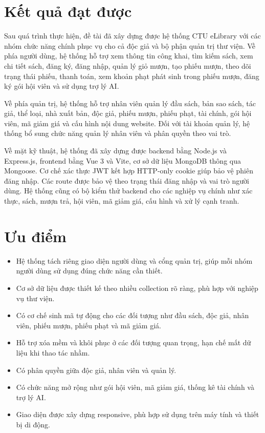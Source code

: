 \documentclass[../main.tex]{subfiles}
\begin{document}
\section{Kết quả đạt được}

Sau quá trình thực hiện, đề tài đã xây dựng được hệ thống CTU eLibrary với các nhóm chức năng chính phục vụ cho cả độc giả và bộ phận quản trị thư viện. Về phía người dùng, hệ thống hỗ trợ xem thông tin công khai, tìm kiếm sách, xem chi tiết sách, đăng ký, đăng nhập, quản lý giỏ mượn, tạo phiếu mượn, theo dõi trạng thái phiếu, thanh toán, xem khoản phạt phát sinh trong phiếu mượn, đăng ký gói hội viên và sử dụng trợ lý AI.

Về phía quản trị, hệ thống hỗ trợ nhân viên quản lý đầu sách, bản sao sách, tác giả, thể loại, nhà xuất bản, độc giả, phiếu mượn, phiếu phạt, tài chính, gói hội viên, mã giảm giá và cấu hình nội dung website. Đối với tài khoản quản lý, hệ thống bổ sung chức năng quản lý nhân viên và phân quyền theo vai trò.

Về mặt kỹ thuật, hệ thống đã xây dựng được backend bằng Node.js và Express.js, frontend bằng Vue 3 và Vite, cơ sở dữ liệu MongoDB thông qua Mongoose. Cơ chế xác thực JWT kết hợp HTTP-only cookie giúp bảo vệ phiên đăng nhập. Các route được bảo vệ theo trạng thái đăng nhập và vai trò người dùng. Hệ thống cũng có bộ kiểm thử backend cho các nghiệp vụ chính như xác thực, sách, mượn trả, hội viên, mã giảm giá, cấu hình và xử lý cạnh tranh.

\section{Ưu điểm}

\begin{itemize}
    \item Hệ thống tách riêng giao diện người dùng và cổng quản trị, giúp mỗi nhóm người dùng sử dụng đúng chức năng cần thiết.
    \item Cơ sở dữ liệu được thiết kế theo nhiều collection rõ ràng, phù hợp với nghiệp vụ thư viện.
    \item Có cơ chế sinh mã tự động cho các đối tượng như đầu sách, độc giả, nhân viên, phiếu mượn, phiếu phạt và mã giảm giá.
    \item Hỗ trợ xóa mềm và khôi phục ở các đối tượng quan trọng, hạn chế mất dữ liệu khi thao tác nhầm.
    \item Có phân quyền giữa độc giả, nhân viên và quản lý.
    \item Có chức năng mở rộng như gói hội viên, mã giảm giá, thống kê tài chính và trợ lý AI.
    \item Giao diện được xây dựng responsive, phù hợp sử dụng trên máy tính và thiết bị di động.
\end{itemize}
\end{document}
